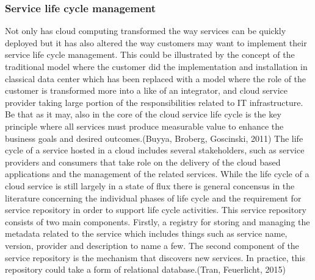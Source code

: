 \documentclass{article}
\begin{document}
\subsubsection{Service life cycle management}
Not only has cloud computing transformed the way services can be quickly deployed but it has also altered the way customers may want to implement their service life cycle management.
This could be illustrated by the concept of the traditional model where the customer did the implementation and installation in classical data center which has been replaced with a model where the role of the customer is transformed more into a like of an integrator, and cloud service provider taking large portion of the responsibilities related to IT infrastructure. Be that as it may, also in the core of the cloud service life cycle is the key principle where all services must produce measurable value to enhance the business goals and desired outcomes.(Buyya, Broberg, Goscinski, 2011)
The life cycle of a service hosted in a cloud includes several stakeholders, such as service providers and consumers that take role on the delivery of the cloud based applications and the management of the related services. While the life cycle of a cloud service is still largely in a state of flux there is general concensus in the literature concerning the individual phases of life cycle and the requirement for service repository in order to support life cycle activities.
This service repository consists of two main components. Firstly, a registry for storing and managing the metadata related to the service which includes things such as service name, version, provider and description to name a few. The second component of the service repository is the mechanism that discovers new services. In practice, this repository could take a form of relational database.(Tran, Feuerlicht, 2015)
\par
\end{document}
